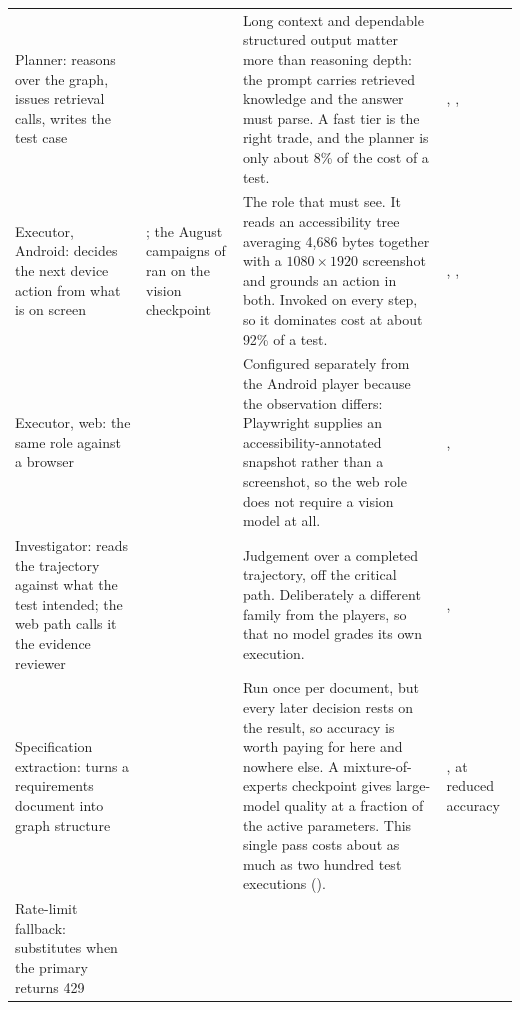 \begin{xltabular}{\textwidth}{@{}>{\hsize}Y>{\hsize}Y>{\hsize}Y>{\hsize}Y@{}}
  Planner: reasons over the graph, issues retrieval calls, writes the test case &
   &
  Long context and dependable structured output matter more than reasoning depth: the prompt carries retrieved knowledge and the answer must parse. A fast tier is the right trade, and the planner is only about 8\% of the cost of a test. &
  , ,  \\
  \addlinespace
  Executor, Android: decides the next device action from what is on screen &
  ; the August campaigns of  ran on the vision checkpoint  &
  The role that must see. It reads an accessibility tree averaging 4{,}686 bytes together with a $1080\times1920$ screenshot and grounds an action in both. Invoked on every step, so it dominates cost at about 92\% of a test. &
  , ,  \\
  \addlinespace
  Executor, web: the same role against a browser &
   &
  Configured separately from the Android player because the observation differs: Playwright supplies an accessibility-annotated snapshot rather than a screenshot, so the web role does not require a vision model at all. &
  ,  \\
  \addlinespace
  Investigator: reads the trajectory against what the test intended; the web path calls it the evidence reviewer &
   &
  Judgement over a completed trajectory, off the critical path. Deliberately a different family from the players, so that no model grades its own execution. &
  ,  \\
  \addlinespace
  Specification extraction: turns a requirements document into graph structure &
   &
  Run once per document, but every later decision rests on the result, so accuracy is worth paying for here and nowhere else. A mixture-of-experts checkpoint gives large-model quality at a fraction of the active parameters. This single pass costs about as much as two hundred test executions (). &
  ,  at reduced accuracy \\
  \addlinespace
  Rate-limit fallback: substitutes when the primary returns 429 &

\end{xltabular}
